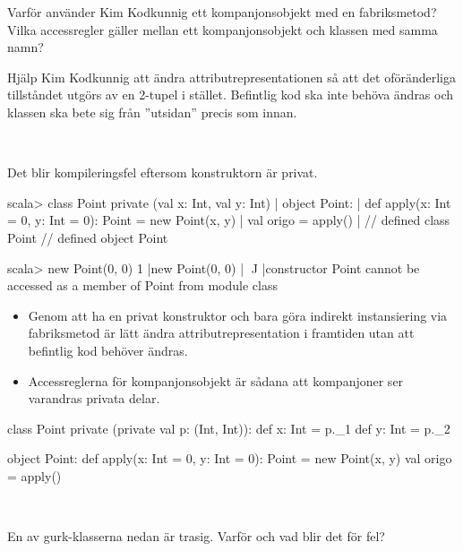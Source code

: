 \Subtask Varför använder Kim Kodkunnig ett kompanjonsobjekt med en fabriksmetod? Vilka accessregler gäller mellan ett kompanjonsobjekt och klassen med samma namn?

\Subtask Hjälp Kim Kodkunnig att ändra attributrepresentationen så att det oföränderliga tillståndet utgörs av en 2-tupel  i stället. Befintlig kod ska inte behöva ändras och klassen  ska bete sig från ''utsidan'' precis som innan.

\SOLUTION

\TaskSolved \what~

\SubtaskSolved Det blir kompileringsfel eftersom konstruktorn är privat.
\begin{REPL}
scala> class Point private (val x: Int, val y: Int)
     | object Point:
     |   def apply(x: Int = 0, y: Int = 0): Point = new Point(x, y)
     |   val origo = apply()
     |
// defined class Point
// defined object Point

scala> new Point(0, 0)
1 |new Point(0, 0)
  |    ^^^^^
  |constructor Point cannot be accessed as a member of Point from module class
\end{REPL}

\SubtaskSolved
\begin{itemize}
  \item Genom att ha en privat konstruktor och bara göra indirekt instansiering via fabriksmetod är lätt ändra attributrepresentation i framtiden utan att befintlig kod behöver ändras.

  \item Accessreglerna för kompanjonsobjekt är sådana att kompanjoner ser varandras privata delar.
\end{itemize}

\SubtaskSolved

\begin{Code}
class Point private (private val p: (Int, Int)):
  def x: Int = p._1
  def y: Int = p._2

object Point:
  def apply(x: Int = 0, y: Int = 0): Point = new Point(x, y)
  val origo = apply()
\end{Code}

\QUESTEND




\QUESTBEGIN

\Task  \what~

\Subtask En av gurk-klasserna nedan är trasig. Varför och vad blir det för fel?

